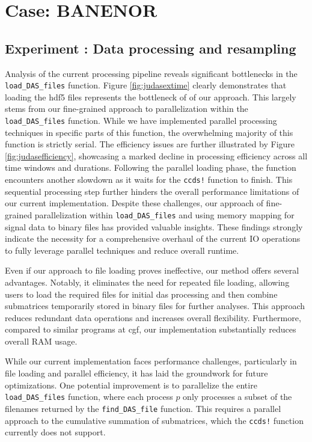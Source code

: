 \section{Case: BANENOR}
\label{disc:banenor}

\subsection{Experiment : Data processing and resampling}

Analysis of the current processing pipeline reveals significant bottlenecks in the \texttt{load\_DAS\_files} function. Figure \ref{fig:judasextime} clearly demonstrates that loading the \acrshort{hdf5} files represents the bottleneck of of our approach. This largely stems from our fine-grained approach to parallelization within the \texttt{load\_DAS\_files} function. While we have implemented parallel processing techniques in specific parts of this function, the overwhelming majority of this function is strictly serial. The efficiency issues are further illustrated by Figure \ref{fig:judasefficiency}, showcasing a marked decline in processing efficiency across all time windows and durations.
Following the parallel loading phase, the function encounters another slowdown as it waits for the \texttt{ccds!} function to finish. This sequential processing step further hinders the overall performance limitations of our current implementation.
Despite these challenges, our approach of fine-grained parallelization within \texttt{load\_DAS\_files} and using memory mapping for signal data to binary files has provided valuable insights. These findings strongly indicate the necessity for a comprehensive overhaul of the current IO operations to fully leverage parallel techniques and reduce overall runtime.

Even if our approach to file loading proves ineffective, our method offers several advantages. Notably, it eliminates the need for repeated file loading, allowing users to load the required files for initial \acrshort{das} processing and then combine submatrices temporarily stored in binary files for further analyses. This approach reduces redundant data operations and increases overall flexibility. Furthermore, compared to similar programs at \acrshort{cgf}, our implementation substantially reduces overall RAM usage.

While our current implementation faces performance challenges, particularly in file loading and parallel efficiency, it has laid the groundwork for future optimizations. One potential improvement is to parallelize the entire \texttt{load\_DAS\_files} function, where each process $p$ only processes a subset of the filenames returned by the \texttt{find\_DAS\_file} function. This requires a parallel approach to the cumulative summation of submatrices, which the \texttt{ccds!} function currently does not support.


